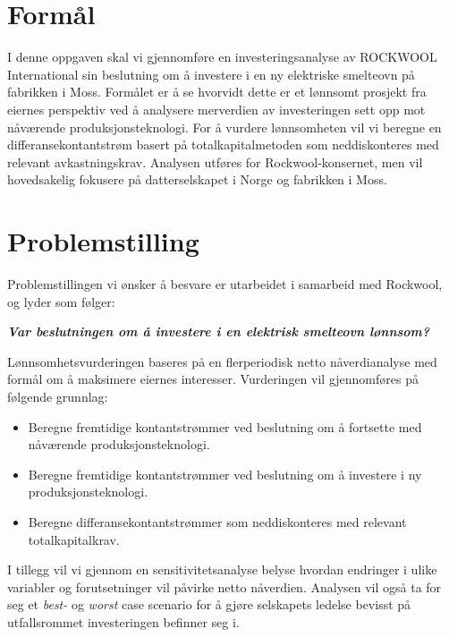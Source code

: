 \section{Formål}
I denne oppgaven skal vi gjennomføre en investeringsanalyse av ROCKWOOL International sin beslutning om å investere i en ny elektriske smelteovn på fabrikken i Moss. Formålet er å se hvorvidt dette er et lønnsomt prosjekt fra eiernes perspektiv ved å analysere merverdien av investeringen sett opp mot nåværende produksjonsteknologi. For å vurdere lønnsomheten vil vi beregne en differansekontantstrøm basert på totalkapitalmetoden som neddiskonteres med relevant avkastningskrav. Analysen utføres for Rockwool-konsernet, men vil hovedsakelig fokusere på datterselskapet i Norge og fabrikken i Moss.

\section{Problemstilling}
Problemstillingen vi ønsker å besvare er utarbeidet i samarbeid med Rockwool, og lyder som følger:

\indent \newline
\textit{\textbf{Var beslutningen om å investere i en elektrisk smelteovn lønnsom?}}

\indent \newline
Lønnsomhetsvurderingen baseres på en flerperiodisk netto nåverdianalyse med formål om å maksimere eiernes interesser. Vurderingen vil gjennomføres på følgende grunnlag:

\begin{itemize}
\item Beregne fremtidige kontantstrømmer ved beslutning om å fortsette med nåværende produksjonsteknologi.
\item Beregne fremtidige kontantstrømmer ved beslutning om å investere i ny produksjonsteknologi.
\item Beregne differansekontantstrømmer som neddiskonteres med relevant totalkapitalkrav.
\end{itemize}

\indent \newline
I tillegg vil vi gjennom en sensitivitetsanalyse belyse hvordan endringer i ulike variabler og forutsetninger vil påvirke netto nåverdien. Analysen vil også ta for seg et \textit{best-} og \textit{worst} case scenario for å gjøre selskapets ledelse bevisst på utfallsrommet investeringen befinner seg i.